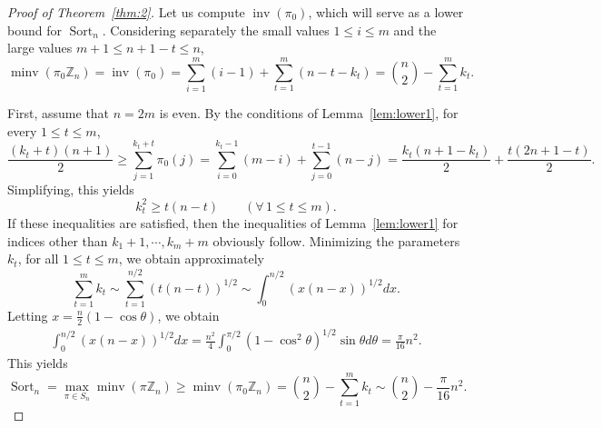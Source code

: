 \documentclass[11pt]{amsart}
\numberwithin{equation}{section}
\newcommand{\ZZ}{{\mathbb {Z}}}
\newcommand{\inv}{{\operatorname{inv}}}
\newcommand{\minv}{{\operatorname{minv}}}
\newcommand{\Sort}{{\operatorname{Sort}}}
\begin{document}
\begin{proof}[Proof of Theorem~\ref{thm:2}]
Let us compute $\inv(\pi_0)$, which will serve as a lower bound for $\Sort_n$.
Considering separately the small values $1 \le i \le m$ and the large values $m+1 \le n+1-t \le n$,
\[
    \minv(\pi_0\ZZ_n)
    = \inv(\pi_0)
    = \sum_{i=1}^{m} (i-1) + \sum_{t=1}^{m}(n-t-k_t)
    = \binom{n}{2} - \sum_{t=1}^{m} k_t.
\]

\medskip

First, assume %
that $n = 2m$ is even.
By the conditions of Lemma~\ref{lem:lower1}, for every $1 \le t \le m$,
\[
    \frac{(k_t+t)(n+1)}{2}
    \ge \sum_{j=1}^{k_t+t} \pi_0(j)
    = \sum_{i=0}^{k_t-1} \left( m-i \right) + \sum_{j=0}^{t-1} \left( n-j \right)
    = \frac{k_t (n+1-k_t)}{2} + \frac{t (2n+1-t)}{2}.
\]
Simplifying, this yields 
\[
    k_t^2 \ge t(n-t)
    \qquad (\forall\, 1\le t \le m).
\]
If these inequalities are satisfied, then the inequalities of Lemma~\ref{lem:lower1} for indices other than $k_1+1, \cdots, k_m+m$ obviously follow.
Minimizing the parameters $k_t$, for all $1\le t\le m$, we obtain approximately
\[
    \sum_{t=1}^{m} k_t
    \sim \sum_{t=1}^{n/2} \left( t(n-t) \right)^{1/2}
    \sim \int_0^{n/2} \left( x(n-x) \right)^{1/2} dx.
\]
Letting $x = \frac{n}{2} (1 - \cos\theta)$, 
we obtain 
\begin{align*}
    \int_0^{n/2}\left (x(n-x)\right)^{1/2} dx
    = \frac{n^2}{4} \int_0^{\pi/2} (1 - \cos^2 \theta)^{1/2} \sin\theta d\theta %
    = \frac{\pi}{16}n^2.
\end{align*}
This yields %
\[
    \Sort_n
    = \max_{\pi \in S_n} \minv(\pi \ZZ_n)
    \ge \minv(\pi_0 \ZZ_n)
    = \binom{n}{2} - \sum_{t=1}^m k_t 
    \sim \binom{n}{2} - \frac{\pi}{16} n^2.
\]


\end{proof}
\end{document}
